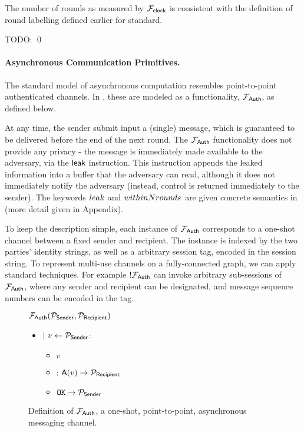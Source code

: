 \begin{theorem}
The number of rounds as measured by $\F{clock}$ is consistent with the definition of round labelling defined earlier for standard.
\end{theorem}
\proof
TODO: 
\qed

\paragraph{Asynchronous Communication Primitives.}
The standard model of asynchronous computation resembles point-to-point authenticated channels. In \SaUCy, these are modeled as a functionality, $\F{Auth}$, as defined below.

At any time, the sender submit input a (single) message, which is guaranteed to be delivered before the end of the next round. The $\F{Auth}$ functionality does not provide any privacy - the message is immediately made available to the adversary, via the ${\mathsf {leak}}$ instruction. This instruction appends the leaked information into a buffer that the adversary can read, although it does not immediately notify the adversary (instead, control is returned immediately to the sender). The keywords ${\bold \mtt{leak}}$ and ${\bold \mtt{within N rounds}}$ are given concrete semantics in \SaUCy (more detail given in Appendix).

To keep the description simple, each instance of $\F{Auth}$ corresponds to a one-shot channel between a fixed sender and recipient.
The instance is indexed by the two parties' identity strings, as well as a arbitrary session tag, encoded in the session string. To represent multi-use channels on a fully-connected graph, we can apply standard techniques. For example $!\F{Auth}$ can invoke arbitrary sub-sessions of $\F{Auth}$, where any sender and recipient can be designated, and message sequence numbers can be encoded in the tag.


\begin{figure}[h!]
\begin{boxedminipage}{\columnwidth}
\begin{centering}
\textbf{$\F{Auth}(\P_{\msf{Sender}}, \P_{\msf{Recipient}})$} \\
\end{centering}
\small
\begin{itemize}[leftmargin=2mm]
  \item[] $|~ v \leftarrow \mathcal P_{{\mathsf {Sender}}}$:
    \begin{itemize}[leftmargin=3mm]
    \item[]  $v$
    \item[] : ${\mathsf {A}}(v) \rightarrow \mathcal P_{{\mathsf {Recipient}}}$
    \item[] $\mathtt {OK} \rightarrow \mathcal P_{{\mathsf {Sender}}}$
    \end{itemize}
\end{itemize}
\end{boxedminipage}
\caption{
\label{fig:fauth}
Definition of $\F{Auth}$, a one-shot, point-to-point, asynchronous messaging channel. }
\end{figure}


